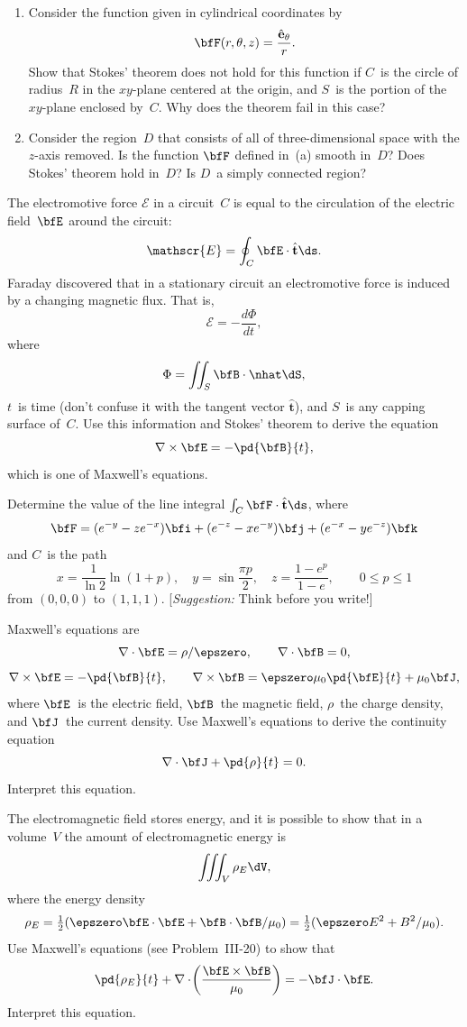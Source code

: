 \begin{problems}
\prob
\begin{enumerate}[label=(\alph*)]
\item Consider the function given in cylindrical coordinates by
\[
  \bfF(r,\theta,z) = \frac{\hat{\mathbf{e}}_\theta}{r}.
\]
Show that Stokes' theorem does not hold for this function if $C$~is the
circle of radius~$R$ in the $xy$-plane centered at the origin, and
$S$~is the portion of the $xy$-plane enclosed by~$C$.  Why does the
theorem fail in this case?
\item Consider the region~$D$ that consists of all of
three-dimensional space with the $z$-axis removed.  Is the function
$\bfF$ defined in~(a) smooth in~$D$?  Does Stokes' theorem hold
in~$D$?  Is $D$~a simply connected region?
\end{enumerate}

\prob
The electromotive force $\mathscr{E}$ in a circuit~$C$ is equal to the
circulation of the electric field~$\bfE$ around the circuit:
\[
  \mathscr{E} = \oint_C\bfE\cdot\hat{\mathbf{t}}\ds.
\]
Faraday discovered that in a stationary circuit an electromotive force
is induced by a changing magnetic flux.  That is,
\[
  \mathscr{E} = -\frac{d\Phi}{dt},
\]
where
\[
  \Phi = \iint_S \bfB\cdot\nhat\dS,
\]
$t$~is time (don't confuse it with the tangent vector
$\hat{\mathbf{t}}$), and $S$~is any capping surface of~$C$.  Use this
information and Stokes' theorem to derive the equation
\[
  \nabla\times\bfE = -\pd{\bfB}{t},
\]
which is one of Maxwell's equations.

\prob
Determine the value of the line integral
$\int_C\bfF\cdot\hat{\mathbf{t}}\ds$, where
\[
  \bfF = (e^{-y}-ze^{-x})\bfi + (e^{-z}-xe^{-y})\bfj
       + (e^{-x}-ye^{-z})\bfk
\]
and $C$~is the path
\[
  x = \frac{1}{\ln 2}\ln(1+p),\quad
  y = \sin\frac{\pi p}{2},\quad
  z = \frac{1-e^p}{1-e},
  \qquad 0\le p\le 1
\]
from $(0,0,0)$ to $(1,1,1)$.  [\emph{Suggestion:} Think before you
write!]

\prob
Maxwell's equations are
\[
  \nabla\cdot\bfE = \rho/\epszero,\qquad
  \nabla\cdot\bfB = 0,
\]
\[
  \nabla\times\bfE = -\pd{\bfB}{t},\qquad
  \nabla\times\bfB = \epszero\mu_0\pd{\bfE}{t} + \mu_0\bfJ,
\]
where $\bfE$~is the electric field, $\bfB$~the magnetic field,
$\rho$~the charge density, and $\bfJ$~the current density.  Use
Maxwell's equations to derive the continuity equation
\[
  \nabla\cdot\bfJ + \pd{\rho}{t} = 0.
\]
Interpret this equation.

\prob
The electromagnetic field stores energy, and it is possible to show
that in a volume~$V$ the amount of electromagnetic energy is
\[
  \iiint_V \rho_E\dV,
\]
where the energy density
\[
  \rho_E = \tfrac{1}{2}(\epszero\bfE\cdot\bfE
          + \bfB\cdot\bfB/\mu_0)
         = \tfrac{1}{2}(\epszero E^2 + B^2/\mu_0).
\]
Use Maxwell's equations (see Problem~III-20) to show that
\[
  \pd{\rho_E}{t}
  + \nabla\cdot\!\left(\frac{\bfE\times\bfB}{\mu_0}\right)
  = -\bfJ\cdot\bfE.
\]
Interpret this equation.


\end{problems}
